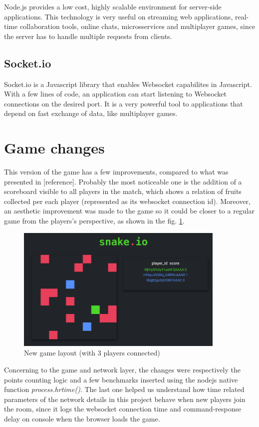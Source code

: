 \documentclass[english]{sbrt}
\begin{document}
Node.js provides a low cost, highly scalable environment for server-side applications. This technology is very useful on streaming web applications, real-time collaboration tools, online chats, microsservices and multiplayer games, since the server has to handle multiple requests from clients.

\subsection{\textbf{Socket.io}}
Socket.io is a Javascript library that enables Websocket capabilites in Javascript. With a few lines of code, an application can start listening to Websocket connections on the desired port. It is a very powerful tool to applications that depend on fast exchange of data, like multiplayer games.

\section{\textbf{Game changes}}

This version of the game has a few improvements, compared to what was presented in [reference]. Probably the most noticeable one is the addition of a scoreboard visible to all players in the match, which shows a relation of fruits collected per each player (represented as its websocket connection id). Moreover, an aesthetic improvement was made to the game so it could be closer to a regular game from the players's perspective, as shown in the fig. \ref{screen}.

\begin{figure}[H]
  \centering
  \includegraphics[width=10cm]{graphs/screen.png}
  \caption{New game layout (with 3 players connected)}
  \label{screen}
\end{figure}

Concerning to the game and network layer, the changes were respectively the points counting logic and
a few benchmarks inserted using the nodejs native function \textit{process.hrtime()}. The last one helped us understand how time related parameters of the network details in this project behave when
new players join the room, since it logs the websocket connection time and command-response delay on console when the browser loads the game.
\end{document}
